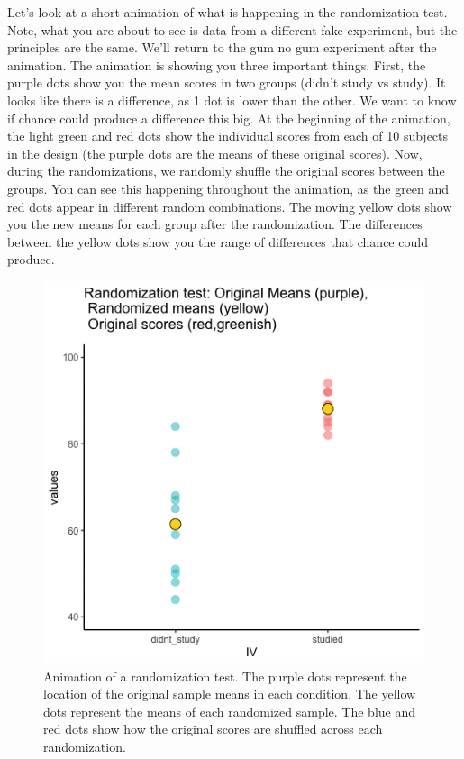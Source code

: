 \documentclass[
]{book}
\begin{document}
Let's look at a short animation of what is happening in the randomization test. Note, what you are about to see is data from a different fake experiment, but the principles are the same. We'll return to the gum no gum experiment after the animation. The animation is showing you three important things. First, the purple dots show you the mean scores in two groups (didn't study vs study). It looks like there is a difference, as 1 dot is lower than the other. We want to know if chance could produce a difference this big. At the beginning of the animation, the light green and red dots show the individual scores from each of 10 subjects in the design (the purple dots are the means of these original scores). Now, during the randomizations, we randomly shuffle the original scores between the groups. You can see this happening throughout the animation, as the green and red dots appear in different random combinations. The moving yellow dots show you the new means for each group after the randomization. The differences between the yellow dots show you the range of differences that chance could produce.

\begin{figure}
\centering
\includegraphics{gifs/randomizationTest-1.gif}
\caption{\label{fig:5randtest}Animation of a randomization test. The purple dots represent the location of the original sample means in each condition. The yellow dots represent the means of each randomized sample. The blue and red dots show how the original scores are shuffled across each randomization.}
\end{figure}
\end{document}
